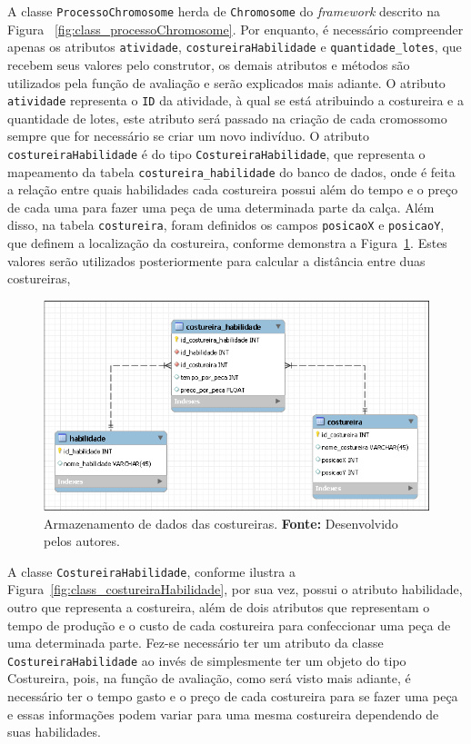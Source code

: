 \par A classe \texttt{ProcessoChromosome} herda de \texttt{Chromosome} do
\textit{framework} descrito na Figura ~\ref{fig:class_processoChromosome}. Por
enquanto, é necessário compreender apenas os atributos \texttt{atividade}, \texttt{costureiraHabi\-lidade} e
\texttt{quantidade\_lotes}, que recebem seus valores pelo construtor, os
demais atributos e métodos são utilizados pela função de avaliação e serão explicados mais adiante. 
O atributo \texttt{atividade} representa o \texttt{ID} da
atividade, à qual se está atribuindo a costureira e a
quantidade de lotes, este atributo será passado na criação de cada cromossomo
sempre que for necessário se criar um novo indivíduo. O atributo \texttt{costureiraHabilidade} 
é do tipo \texttt{CostureiraHabilidade}, que representa o mapeamento da tabela \texttt{costureira\_habilidade} do banco de dados, onde 
é feita a relação entre quais habilidades cada costureira possui além do tempo e o preço de cada uma para 
fazer uma peça de uma determinada parte da calça. Além disso, na tabela \texttt{costureira}, foram definidos os campos \texttt{posicaoX} e \texttt{posicaoY}, que definem a localização da costureira, conforme demonstra a Figura~\ref{fig:dados_costureiras}. Estes valores serão utilizados posteriormente para calcular a distância entre duas costureiras, 



\begin{figure}[h!]
	\centerline{\includegraphics[scale=0.6]{./imagens/costureira_habilidade_tabela.png}}
	\caption[Armazenamento de dados das costureiras.]
	{Armazenamento de dados das costureiras. \textbf{Fonte:} Desenvolvido pelos
	autores.}
	\label{fig:dados_costureiras}
\end{figure}


\par A classe \texttt{CostureiraHabilidade}, conforme ilustra a Figura~\ref{fig:class_costureiraHabilidade}, por sua vez, possui o atributo habilidade, outro que representa a costureira, além de dois atributos que representam o tempo de produção e o custo 
de cada costureira para confeccionar uma peça de uma determinada parte. Fez-se
necessário ter um atributo da classe \texttt{Costureira\-Habilidade} ao invés de
simplesmente ter um objeto do tipo Costureira, pois, na função de avaliação, como será visto mais adiante, é necessário ter o tempo gasto e o preço de cada costureira para se fazer uma peça 
e essas informações podem variar para uma mesma costureira dependendo de suas habilidades.



